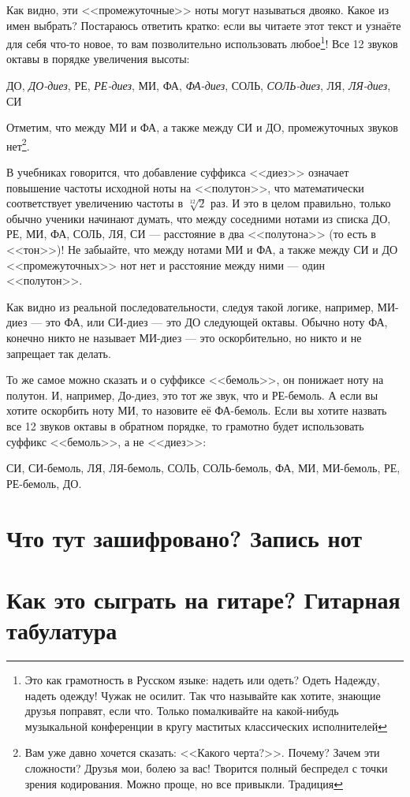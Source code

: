 Как видно, эти <<промежуточные>> ноты могут называться двояко. Какое из имен выбрать? Постараюсь ответить кратко: если вы читаете этот текст и узнаёте для себя что-то новое, то вам позволительно использовать любое\footnote{Это как грамотность в Русском языке: надеть или одеть? Одеть Надежду, надеть одежду! Чужак не осилит. Так что называйте как хотите, знающие друзья поправят, если что. Только помалкивайте на какой-нибудь музыкальной конференции в кругу маститых классических исполнителей}! Все 12 звуков октавы в порядке увеличения высоты:
\begin{center}
    ДО, \emph{ДО-диез}, РЕ, \emph{РЕ-диез}, МИ, ФА, \emph{ФА-диез}, СОЛЬ, \emph{СОЛЬ-диез}, ЛЯ, \emph{ЛЯ-диез}, СИ
\end{center}

Отметим, что между МИ и ФА, а также между СИ и ДО, промежуточных звуков нет\footnote{Вам уже давно хочется сказать: <<Какого черта?>>. Почему? Зачем эти сложности? Друзья мои, болею за вас! Творится полный беспредел с точки зрения кодирования. Можно проще, но все привыкли. Традиция}.

В учебниках говорится, что добавление суффикса <<диез>> означает повышение частоты исходной ноты на <<полутон>>, что математически соответствует увеличению частоты в $\sqrt[12]{2}$ раз. И это в целом правильно, только обычно ученики начинают думать, что между соседними нотами из списка ДО, РЕ, МИ, ФА, СОЛЬ, ЛЯ, СИ --- расстояние в два <<полутона>> (то есть в <<тон>>)! Не забыайте, что между нотами МИ и ФА, а также между СИ и ДО <<промежуточных>> нот нет и расстояние между ними --- один <<полутон>>. 

Как видно из реальной последовательности, следуя такой логике, например, МИ-диез --- это ФА, или СИ-диез --- это ДО следующей октавы. Обычно ноту ФА, конечно никто не называет МИ-диез --- это оскорбительно, но никто и не запрещает так делать. 

То же самое можно сказать и о суффиксе <<бемоль>>, он понижает ноту на полутон. И, например, До-диез, это тот же звук, что и РЕ-бемоль. А если вы хотите оскорбить ноту МИ, то назовите её ФА-бемоль. Если вы хотите назвать все 12 звуков октавы в обратном порядке, то грамотно будет использовать суффикс <<бемоль>>, а не <<диез>>:

\begin{center}
СИ, СИ-бемоль, ЛЯ, ЛЯ-бемоль, СОЛЬ, СОЛЬ-бемоль, ФА, МИ, МИ-бемоль, РЕ, РЕ-бемоль, ДО.
\end{center}


\section{Что тут зашифровано? Запись нот}


\section{Как это сыграть на гитаре? Гитарная табулатура}



